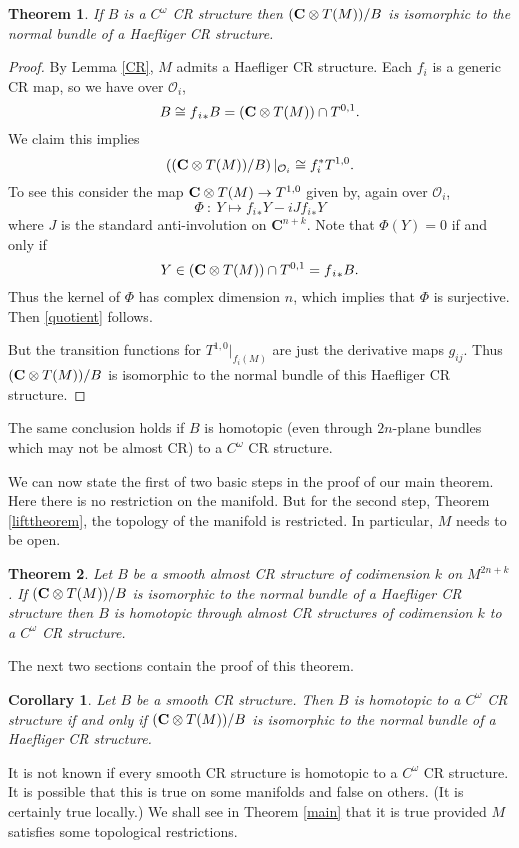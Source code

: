 \documentclass{amsart}
\newtheorem{theorem}{Theorem}[section]
\newtheorem{corollary}{Corollary}
\begin{document}
\begin{theorem}\label{easy}
If $B$ is a $C^\omega$ CR structure then $({{\bf{C}}\otimes T(M)} )/B$ is isomorphic to the normal bundle of a Haefliger  CR structure.
\end{theorem}
\begin{proof}
By Lemma \ref{CR}, $M$ admits a Haefliger  CR structure.  Each $f_i$ is a
generic CR map, so we have over ${\mathcal{O}} _i$, 
\[
B\cong f{_i}_*B=({{\bf{C}}\otimes T(M)} )\cap {T^{0,1}} .
\]
We claim this implies  
\begin{equation}\label {quotient}
\left( ({{\bf{C}}\otimes T(M)} )/B \right) \vert _{{\mathcal{O}}_i} \cong f_i^*T^{1,0} .
\end{equation}
To see this consider the map ${{\bf{C}}\otimes T(M)} \to {T^{1,0}}$ given by, again over
${\mathcal{O}} _i$,
\[
\Phi\ :\ Y \mapsto f{_i}_*Y -iJf{_i}_*Y
\]
where $J$ is the standard anti-involution on ${\mathbf{C}} ^{n+k}$.  Note that $\Phi (Y)=0$
{if and only if } 
\[
Y\in ({{\bf{C}}\otimes T(M)} )\cap {T^{0,1}} = f{_i}_*B .
\]
Thus the kernel of $\Phi$ has complex dimension $n$, which implies that
$\Phi$ is surjective.  Then  \eqref{quotient} follows.

But the transition functions for $T^{1,0}|_{f_i(M)}$ are just the derivative maps $g_{ij}$.  Thus  $({{\bf{C}}\otimes T(M)} )/B$ is isomorphic to the normal bundle of this Haefliger  CR structure.
\end{proof}
The same conclusion holds if $B$ is homotopic (even through $2n$-plane
bundles which may not be almost CR) to a $C^\omega$ CR structure.

We can now state the first of two basic steps in the proof of our main
theorem.  Here there is no restriction on the manifold.  But for the
second step, Theorem \ref{lifttheorem}, the topology of the manifold is
restricted.  In particular, $M$ needs to be open.

\begin{theorem}\label{CRn}
Let $B$ be a smooth  almost  CR structure of codimension $k$ on $M^{2n+k}$.  If $({{\bf{C}}\otimes T(M)} )/B$ is isomorphic to the normal bundle of a Haefliger  CR structure then $B$ is homotopic through almost CR structures of codimension $k$ to a  $C^\omega$ CR structure.
\end{theorem}
The next two sections contain the proof of this theorem.

\begin{corollary}
Let $B$ be a smooth CR structure.  Then $B$ is homotopic to a $C^\omega$ CR structure if and only if 
$({{\bf{C}}\otimes T(M)} )/B$ is isomorphic to the normal bundle of a Haefliger  CR structure.
\end{corollary}
It is not known if every smooth CR structure is homotopic to a
$C^\omega$ CR structure.  It is possible that this is true on some
manifolds and false on others.  (It is certainly true locally.)  We
shall see in Theorem \ref{main} that it is true provided $M$ satisfies some topological
restrictions.  
\end{document}
